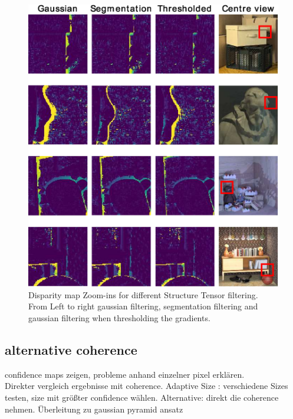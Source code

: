 \documentclass  [
  paper    = a4,
  BCOR     = 10mm,
  twoside,
  fontsize = 12pt,
  fleqn,
  toc      = bibnumbered,
  toc      = listofnumbered,
  numbers  = noendperiod,
  headings = normal,
  listof   = leveldown,
  version  = 3.03
]                                       {scrreprt}
\begin{document}
\begin{figure}
	\centering
	\includegraphics[width=1\linewidth]{images/thresh_results_morph}
	\caption[Disparity map Zoom-ins for different methods]{Disparity map Zoom-ins for different Structure Tensor filtering. From Left to right gaussian filtering, segmentation filtering and gaussian filtering when thresholding the gradients.}
	\label{fig:threshresultsmorph}
\end{figure}



\subsection{alternative coherence}
confidence maps zeigen, probleme anhand einzelner pixel erklären.\\
Direkter vergleich ergebnisse mit coherence.
Adaptive Size : verschiedene Sizes testen, size mit größter confidence wählen. Alternative: direkt die coherence nehmen. Überleitung zu gaussian pyramid ansatz
\end{document}
